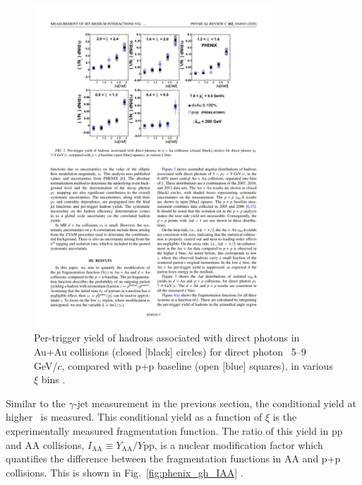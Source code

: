 \begin{figure}[htpb]
  \centering
  \includegraphics[width=0.8\textwidth]{Introduction/phenix_gh_corr.pdf}
  \caption{Per-trigger yield of hadrons associated with direct photons in Au+Au collisions (closed [black] circles) for direct photon \pT~5–9 GeV/$c$, compared with p+p baseline (open [blue] squares), in various $\xi$ bins \cite{PHENIXCollaboration2020}.}
  \label{fig:phenix_gh_corr}
\end{figure}

Similar to the $\gamma$-jet measurement in the previous section, the conditional yield at higher \deltaphi~is measured. This conditional yield as a function of $\xi$ is the experimentally measured fragmentation function. The ratio of this yield in pp and AA collisions, $I_\mathrm{AA} \equiv Y_\mathrm{AA}/Y\mathrm{pp}$, is a nuclear modification factor which quantifies the difference between the fragmentation functions in AA and p+p collisions. This is shown in Fig.~\ref{fig:phenix_gh_IAA} \cite{PHENIXCollaboration2020}. 

